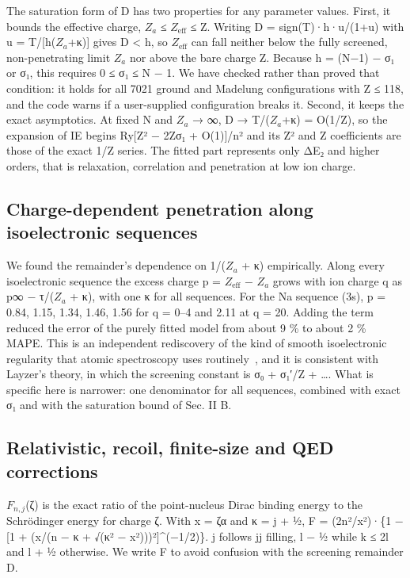 \documentclass[aps,pra,preprint,notitlepage,superscriptaddress,amsmath,amssymb]{revtex4-2}
\begin{document}
The saturation form of D has two properties for any parameter values. First, it bounds the effective charge, $Z_{a}$ ≤ $Z_{\mathrm{eff}}$ ≤ Z. Writing D = sign(T)·h·u/(1+u) with u = \textbar{}T\textbar{}/[h($Z_{a}$+κ)] gives \textbar{}D\textbar{} < h, so $Z_{\mathrm{eff}}$ can fall neither below the fully screened, non-penetrating limit $Z_{a}$ nor above the bare charge Z. Because h = (N−1) − σ₁ or σ₁, this requires 0 ≤ σ₁ ≤ N − 1. We have checked rather than proved that condition: it holds for all 7021 ground and Madelung configurations with Z ≤ 118, and the code warns if a user-supplied configuration breaks it. Second, it keeps the exact asymptotics. At fixed N and $Z_{a}$ → ∞, D → T/($Z_{a}$+κ) = O(1/Z), so the expansion of IE begins Ry[Z² − 2Zσ₁ + O(1)]/n² and its Z² and Z coefficients are those of the exact 1/Z series. The fitted part represents only ΔE₂ and higher orders, that is relaxation, correlation and penetration at low ion charge.


\subsection{Charge-dependent penetration along isoelectronic sequences}

We found the remainder's dependence on 1/($Z_{a}$ + κ) empirically. Along every isoelectronic sequence the excess charge p = $Z_{\mathrm{eff}}$ − $Z_{a}$ grows with ion charge q as p∞ − τ/($Z_{a}$ + κ), with one κ for all sequences. For the Na sequence (3s), p = 0.84, 1.15, 1.34, 1.46, 1.56 for q = 0–4 and 2.11 at q = 20. Adding the term reduced the error of the purely fitted model from about 9 \% to about 2 \% MAPE. This is an independent rediscovery of the kind of smooth isoelectronic regularity that atomic spectroscopy uses routinely~\cite{r8}, and it is consistent with Layzer's theory, in which the screening constant is σ₀ + σ₁′/Z + …. What is specific here is narrower: one denominator for all sequences, combined with exact σ₁ and with the saturation bound of Sec. II B.


\subsection{Relativistic, recoil, finite-size and QED corrections}

$F_{n,j}$(ζ) is the exact ratio of the point-nucleus Dirac binding energy to the Schrödinger energy for charge ζ. With x = ζα and κ = j + ½, F = (2n²/x²)·\{1 − [1 + (x/(n − κ + √(κ² − x²)))²]\textasciicircum{}(−1/2)\}. j follows jj filling, l − ½ while k ≤ 2l and l + ½ otherwise. We write F to avoid confusion with the screening remainder D.
\end{document}
